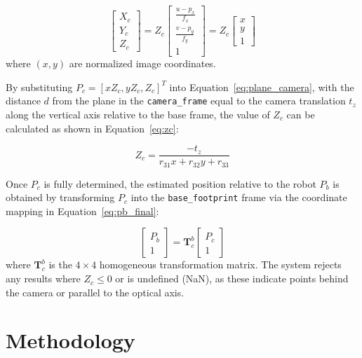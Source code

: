 \documentclass[journal]{IAENGtran}
\begin{document}
\begin{equation} \label{eq:coordinate_camera}
\begin{bmatrix} X_c \\ Y_c \\ Z_c \end{bmatrix} = Z_c 
\begin{bmatrix} \frac{u - p_x}{f_x} \\ \frac{v - p_y}{f_y} \\ 1 \end{bmatrix} = Z_c 
\begin{bmatrix} x \\ y \\ 1 \end{bmatrix}
\end{equation}
where $(x, y)$ are normalized image coordinates.

By substituting $P_c = [x Z_c, y Z_c, Z_c]^T$ into Equation~\ref{eq:plane_camera}, with
the distance $d$ from the plane in the \texttt{camera\_frame} equal to
the camera translation $t_z$ along the vertical axis relative to the base frame,
the value of $Z_c$ can be calculated as shown in Equation~\ref{eq:zc}:

\begin{equation} \label{eq:zc}
Z_c = \frac{-t_z}{r_{31} x + r_{32} y + r_{33}}
\end{equation}

Once $P_c$ is fully determined, the estimated position relative to the robot $P_b$
is obtained by transforming $P_c$ into the \texttt{base\_footprint} frame via the 
coordinate mapping in Equation~\ref{eq:pb_final}:

\begin{equation} \label{eq:pb_final}
\begin{bmatrix} P_b \\ 1 \end{bmatrix} = \mathbf{T}_{c}^{b} \begin{bmatrix} P_c \\ 1 \end{bmatrix}
\end{equation}
where $\mathbf{T}_{c}^{b}$ is the $4 \times 4$ homogeneous transformation matrix.
The system rejects any results where $Z_c \leq 0$ or is undefined (NaN),
as these indicate points behind the camera or parallel to the optical axis.

\section{Methodology}
\end{document}
